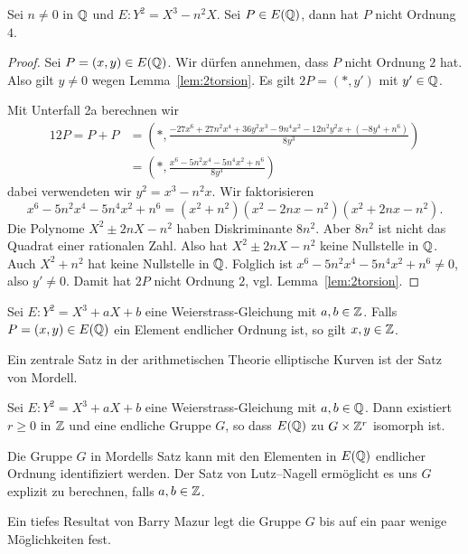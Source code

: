 \begin{lemma}
  \label{len:noorder4}
  Sei $n\not=0$ in ${\mathbb{Q}}$ und $E:Y^2 = X^3-n^2X$. Sei $P\in E({\mathbb{Q}})$,
  dann hat $P$ nicht Ordnung $4$. 
\end{lemma}
\begin{proof}
  Sei  $P =(x,y)\in E({\mathbb{Q}})$. Wir dürfen annehmen, dass $P$ nicht
  Ordnung $2$ hat. Also gilt $y\not=0$ wegen Lemma~\ref{lem:2torsion}.
  Es gilt  
  $2P=(*,y')$ mit $y'\in {\mathbb{Q}}$.

  Mit Unterfall 2a berechnen wir
  \begin{alignat*}1
    2P= P+P &=\left(*, \frac{-27x^6 + 27n^2x^4 + 36y^2x^3 -
        9n^4x^2 - 12n^2y^2x + (-8y^4 + n^6)}{8y^3}\right)\\
    &= \left(*, \frac{x^6 - 5n^2x^4 - 5n^4x^2 + n^6}{8y^3}\right)
  \end{alignat*}
  dabei verwendeten wir $y^2 = x^3-n^2x$.
  Wir faktorisieren
  $$
  x^6 - 5n^2x^4 - 5n^4x^2 + n^6 = (x^2+n^2)(x^2-2nx-n^2)(x^2+2nx-n^2). 
  $$
  Die Polynome $X^2\pm 2nX-n^2$ haben Diskriminante $8n^2$. Aber
  $8n^2$ ist nicht das Quadrat einer rationalen Zahl. Also hat $X^2\pm
  2nX-n^2$ keine Nullstelle in ${\mathbb{Q}}$. Auch $X^2+n^2$ hat keine
  Nullstelle in ${\mathbb{Q}}$. Folglich ist
  $x^6 - 5n^2x^4 - 5n^4x^2 + n^6\not=0$, also $y'\not=0$. Damit hat $2P$ nicht
  Ordnung $2$, vgl. Lemma~\ref{lem:2torsion}. 
\end{proof}

\begin{satz}
  Sei $E:Y^2=X^3+aX+b$ eine Weierstrass-Gleichung mit $a,b\in{\mathbb{Z}}$.
  Falls $ P =(x,y)\in E({\mathbb{Q}})$ ein Element endlicher Ordnung ist, so
  gilt $x,y\in{\mathbb{Z}}$. 
\end{satz}

Ein zentrale Satz in der arithmetischen Theorie elliptische Kurven ist
der Satz von Mordell.

\begin{satz}[Mordell (1922)] Sei $E:Y^2 = X^3+aX+b$ eine
  Weierstrass-Gleichung mit $a,b\in{\mathbb{Q}}$. Dann existiert $r\ge 0$ in
  ${\mathbb{Z}}$ und eine endliche Gruppe $G$, so dass
  $E({\mathbb{Q}})$ zu $G\times {\mathbb{Z}}^r$ isomorph ist.
\end{satz}

Die Gruppe $G$ in Mordells Satz kann mit den Elementen in $E({\mathbb{Q}})$
endlicher Ordnung identifiziert werden. Der Satz von Lutz--Nagell
ermöglicht es uns $G$ explizit zu berechnen, falls $a,b\in{\mathbb{Z}}$.

Ein tiefes Resultat von Barry Mazur legt die Gruppe $G$ bis auf ein
paar wenige Möglichkeiten fest.

